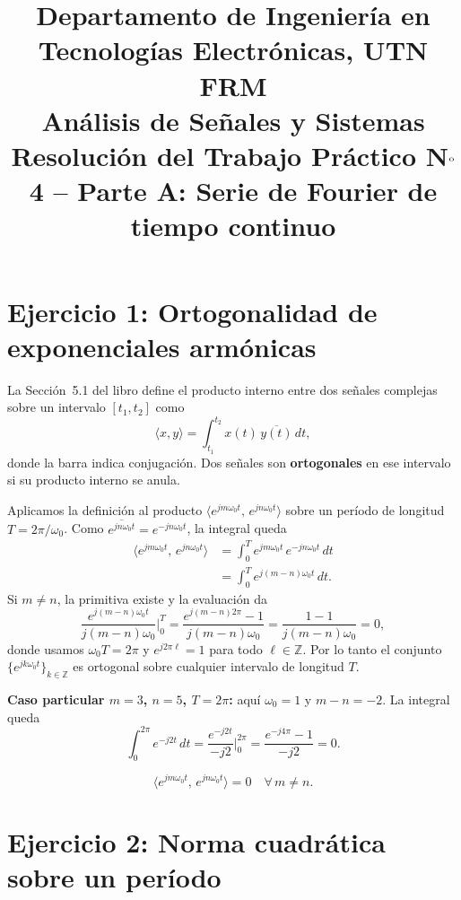 \documentclass[10pt,a4paper]{article}
\title{%
	{\normalsize Departamento de Ingeniería en Tecnologías Electrónicas, UTN FRM}\\[0.1cm]
	{\large Análisis de Señales y Sistemas}\\[0.15cm]
	{\normalsize Resolución del Trabajo Práctico N$^{\text o}$4 -- Parte A: Serie de Fourier de tiempo continuo}%
}
\author{}
\date{}
\begin{document}
	\maketitle
	\thispagestyle{fancy}

	\label{sec:resolucion}

	\section*{Ejercicio 1: Ortogonalidad de exponenciales armónicas}

	La Sección~5.1 del libro define el producto interno entre dos señales complejas sobre un intervalo $[t_1, t_2]$ como
	\[
		\langle x, y\rangle = \int_{t_1}^{t_2} x(t)\,\overline{y(t)}\,dt,
	\]
	donde la barra indica conjugación. Dos señales son \textbf{ortogonales} en ese intervalo si su producto interno se anula.

	Aplicamos la definición al producto $\langle e^{jm\omega_0 t},\, e^{jn\omega_0 t}\rangle$ sobre un período de longitud $T = 2\pi/\omega_0$. Como $\overline{e^{jn\omega_0 t}} = e^{-jn\omega_0 t}$, la integral queda
	\begin{align*}
		\langle e^{jm\omega_0 t},\, e^{jn\omega_0 t}\rangle
		&= \int_{0}^{T} e^{jm\omega_0 t}\,e^{-jn\omega_0 t}\,dt \\
		&= \int_{0}^{T} e^{j(m-n)\omega_0 t}\,dt.
	\end{align*}
	Si $m \ne n$, la primitiva existe y la evaluación da
	\[
		\frac{e^{j(m-n)\omega_0 t}}{j(m-n)\omega_0}\bigg|_{0}^{T}
		= \frac{e^{j(m-n)2\pi} - 1}{j(m-n)\omega_0}
		= \frac{1 - 1}{j(m-n)\omega_0} = 0,
	\]
	donde usamos $\omega_0 T = 2\pi$ y $e^{j2\pi\ell} = 1$ para todo $\ell \in \mathbb{Z}$. Por lo tanto el conjunto $\{e^{jk\omega_0 t}\}_{k\in\mathbb{Z}}$ es ortogonal sobre cualquier intervalo de longitud $T$.

	\textbf{Caso particular $m = 3$, $n = 5$, $T = 2\pi$:} aquí $\omega_0 = 1$ y $m - n = -2$. La integral queda
	\[
		\int_{0}^{2\pi} e^{-j2t}\,dt = \frac{e^{-j2t}}{-j2}\bigg|_{0}^{2\pi} = \frac{e^{-j4\pi} - 1}{-j2} = 0.
	\]

	\[
		\boxed{\langle e^{jm\omega_0 t},\, e^{jn\omega_0 t}\rangle = 0 \quad \forall\, m \ne n.}
	\]

	\section*{Ejercicio 2: Norma cuadrática sobre un período}
\end{document}
